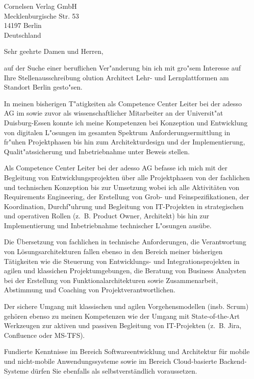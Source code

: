 \documentclass[10pt,a4paper]{dinbrief}
\date{\today}
\begin{document}
 
\begin{letter}  
{%
	Cornelsen Verlag GmbH\\
	Mecklenburgische Str. 53\\
	14197 Berlin\\
	Deutschland
}
\subject{\bf Bewerbung Solution Architect Lehr- und Lernplattformen}
\opening{Sehr geehrte Damen und Herren,}
auf der Suche einer beruflichen Ver"anderung bin ich mit gro"sem Interesse auf Ihre Stellenausschreibung olution Architect Lehr- und Lernplattformen am Standort Berlin gesto"sen. 

In meinen bisherigen T"atigkeiten als Competence Center Leiter bei der adesso AG im sowie zuvor als wissenschaftlicher Mitarbeiter an der Universit"at Duisburg-Essen konnte ich meine Kompetenzen bei Konzeption und Entwicklung von digitalen L"osungen im gesamten Spektrum Anforderungsermittlung in fr"uhen Projektphasen bis hin zum Architekturdesign und der Implementierung, Qualit"atssicherung und Inbetriebnahme unter Beweis stellen.

Als Competence Center Leiter bei der adesso AG befasse ich mich mit der Begleitung von Entwicklungsprojekten über alle Projektphasen von der fachlichen und technischen Konzeption bis zur Umsetzung wobei ich alle Aktivitäten von Requirements Engineering, der Erstellung von Grob- und Feinspezifikationen, der Koordination, Durchf"uhrung und Begleitung von IT-Projekten in strategischen und operativen Rollen (z.~B. Product Owner, Architekt) bis hin zur Implementierung und Inbetriebnahme technischer L"osungen ausübe.

Die Übersetzung von fachlichen in technische Anforderungen, die Verantwortung von Lösungsarchitekturen fallen ebenso in den Bereich meiner bisherigen Tätigkeiten wie die Steuerung von Entwicklungs- und Integrationsprojekten in agilen und klassichen Projektumgebungen, die Beratung von Business Analysten bei der Erstellung von Funktionalarchitekturen sowie Zusammenarbeit, Abstimmung und Coaching von Projektverantwortlichen.

Der sichere Umgang mit klassischen und agilen Vorgehensmodellen (insb. Scrum) gehören ebenso zu meinen Kompetenzen wie der Umgang mit State-of-the-Art Werkzeugen zur aktiven und passiven Begleitung von IT-Projekten (z.~B. Jira, Confluence oder MS-TFS). 

Fundierte Kenntnisse im Bereich Softwareentwicklung und Architektur für mobile und nicht-mobile Anwendungssysteme sowie im Bereich Cloud-basierte Backend-Systeme dürfen Sie ebenfalls als selbstverständlich voraussetzen.\clearpage


\end{letter}
\end{document}
